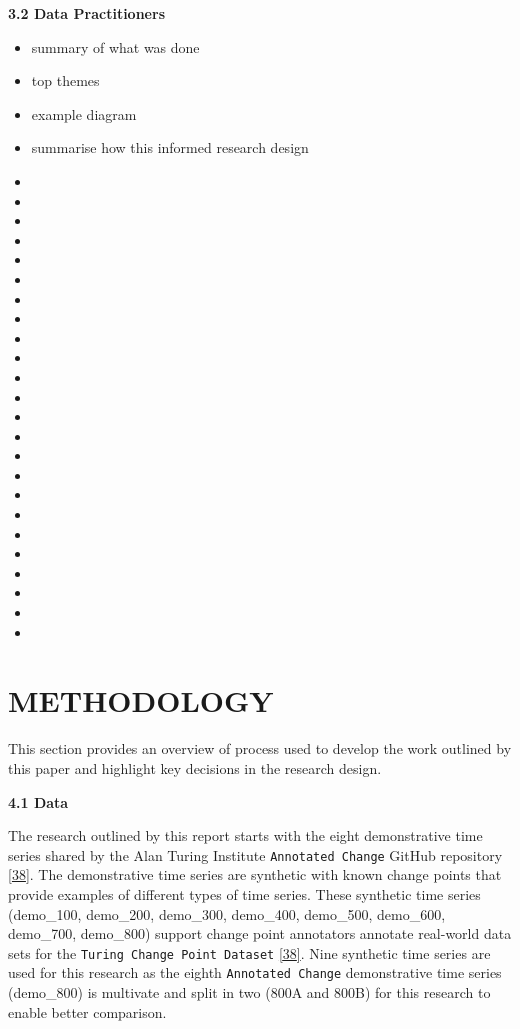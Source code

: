 \documentclass{article}
\providecommand{\tightlist}{%
  \setlength{\itemsep}{0pt}\setlength{\parskip}{0pt}}
\begin{document}
\textbf{3.2 Data Practitioners}

\begin{itemize}
\tightlist
\item
  summary of what was done
\item
  top themes
\item
  example diagram
\item
  summarise how this informed research design
\item
\item
\item
\item
\item
\item
\item
\item
\item
\item
\item
\item
\item
\item
\item
\item
\item
\item
\item
\item
\item
\item
\item
\item
\end{itemize}

\hypertarget{methodology}{%
\section{METHODOLOGY}\label{methodology}}

\label{sec:headings}

This section provides an overview of process used to develop the work
outlined by this paper and highlight key decisions in the research
design.

\textbf{4.1 Data}

The research outlined by this report starts with the eight demonstrative
time series shared by the Alan Turing Institute
\texttt{Annotated\ Change} GitHub repository
\protect\hyperlink{ref-ATIChangePoint}{{[}38{]}}. The demonstrative time
series are synthetic with known change points that provide examples of
different types of time series. These synthetic time series (demo\_100,
demo\_200, demo\_300, demo\_400, demo\_500, demo\_600, demo\_700,
demo\_800) support change point annotators annotate real-world data sets
for the \texttt{Turing\ Change\ Point\ Dataset}
\protect\hyperlink{ref-ATIChangePoint}{{[}38{]}}. Nine synthetic time
series are used for this research as the eighth
\texttt{Annotated\ Change} demonstrative time series (demo\_800) is
multivate and split in two (800A and 800B) for this research to enable
better comparison.
\end{document}
